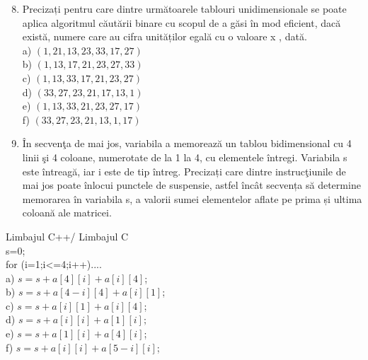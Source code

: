 \documentclass[10pt]{article}
\begin{document}
\begin{enumerate}
  \setcounter{enumi}{7}
  \item Precizați pentru care dintre următoarele tablouri unidimensionale se poate aplica algoritmul căutării binare cu scopul de a găsi în mod eficient, dacă există, numere care au cifra unităților egală cu o valoare x , dată.\\
a) $(1,21,13,23,33,17,27)$\\
b) $(1,13,17,21,23,27,33)$\\
c) $(1,13,33,17,21,23,27)$\\
d) $(33,27,23,21,17,13,1)$\\
e) $(1,13,33,21,23,27,17)$\\
f) $(33,27,23,21,13,1,17)$
  \item În secvenţa de mai jos, variabila a memorează un tablou bidimensional cu 4 linii şi 4 coloane, numerotate de la 1 la 4, cu elementele întregi. Variabila s este întreagă, iar i este de tip întreg. Precizați care dintre instrucţiunile de mai jos poate înlocui punctele de suspensie, astfel încât secvența să determine memorarea în variabila s, a valorii sumei elementelor aflate pe prima și ultima coloană ale matricei.
\end{enumerate}

Limbajul C++/ Limbajul C\\
s=0;\\
for (i=1;i<=4;i++)....\\
a) $s=s+a[4][i]+a[i][4]$;\\
b) $s=s+a[4-i][4]+a[i][1]$;\\
c) $s=s+a[i][1]+a[i][4]$;\\
d) $s=s+a[i][i]+a[1][i] ;$\\
e) $s=s+a[1][i]+a[4][i]$;\\
f) $s=s+a[i][i]+a[5-i][i]$;
\end{document}
